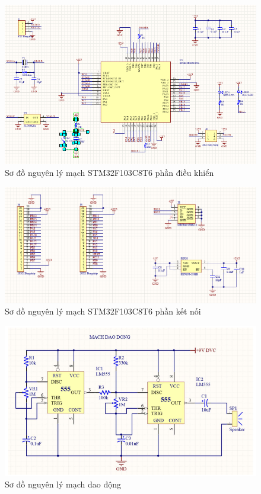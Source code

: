 \documentclass{article}
\begin{document}
\begin{figure}[H]
    \centering
    \includegraphics[width=1\textwidth]{image/sch4a.png}
    \caption{Sơ đồ nguyên lý mạch STM32F103C8T6 phần điều khiển}
    \label{fig:sodonguyenly}
\end{figure}
\begin{figure}[H]
    \centering
    \includegraphics[width=1\textwidth]{image/4b.png}
    \caption{Sơ đồ nguyên lý mạch STM32F103C8T6 phần kết nối}
    \label{fig:sodonguyenly}
\end{figure}
\begin{figure}[H]
    \centering
    \includegraphics[width=1\textwidth]{image/sch5.png}
    \caption{Sơ đồ nguyên lý mạch dao động}
    \label{fig:sodonguyenly}
\end{figure}
\cleardoublepage
\end{document}
